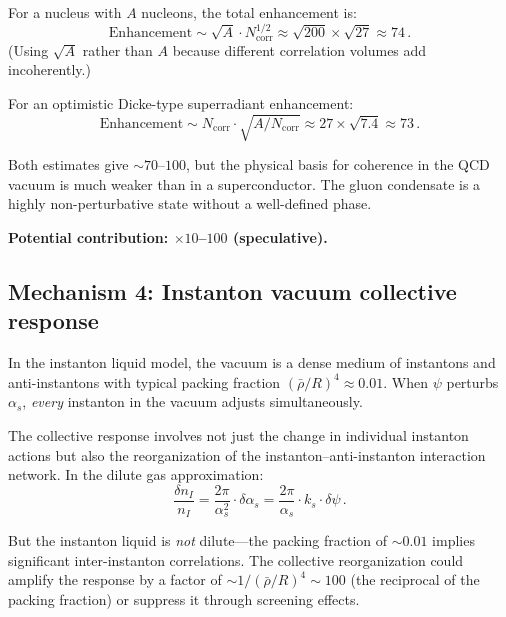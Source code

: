 \documentclass[aps,prd,twocolumn,superscriptaddress,floatfix,nofootinbib]{revtex4-2}
\newcommand{\as}{\alpha_s}
\newcommand{\ks}{k_s}
\newcommand{\dpsi}{\delta\psi}
\begin{document}
For a nucleus with $A$ nucleons, the total enhancement is:
\begin{equation}
\text{Enhancement} \sim \sqrt{A} \cdot N_{\mathrm{corr}}^{1/2}
\approx \sqrt{200} \times \sqrt{27} \approx 74 \, .
\end{equation}
(Using $\sqrt{A}$ rather than $A$ because different correlation volumes add
incoherently.)

For an optimistic Dicke-type superradiant enhancement:
\begin{equation}
\text{Enhancement} \sim N_{\mathrm{corr}} \cdot \sqrt{A/N_{\mathrm{corr}}}
\approx 27 \times \sqrt{7.4} \approx 73 \, .
\end{equation}

Both estimates give $\sim 70$--$100$, but the physical basis for coherence
in the QCD vacuum is much weaker than in a superconductor. The gluon
condensate is a highly non-perturbative state without a well-defined phase.

\textbf{Potential contribution: $\times 10$--$100$ (speculative).}

\subsection{Mechanism 4: Instanton vacuum collective response}
\label{sec:inst_collective}

In the instanton liquid model, the vacuum is a dense medium of instantons and
anti-instantons with typical packing fraction
$(\bar{\rho}/R)^4 \approx 0.01$. When $\psi$ perturbs $\as$, \emph{every}
instanton in the vacuum adjusts simultaneously.

The collective response involves not just the change in individual instanton
actions but also the reorganization of the instanton--anti-instanton
interaction network. In the dilute gas approximation:
\begin{equation}
\frac{\delta n_I}{n_I} = \frac{2\pi}{\as^2} \cdot \delta\as
= \frac{2\pi}{\as} \cdot \ks \cdot \dpsi \, .
\label{eq:dn_inst}
\end{equation}

But the instanton liquid is \emph{not} dilute---the packing fraction of
$\sim 0.01$ implies significant inter-instanton correlations. The collective
reorganization could amplify the response by a factor of
$\sim 1/(\bar{\rho}/R)^4 \sim 100$ (the reciprocal of the packing fraction)
or suppress it through screening effects.
\end{document}
